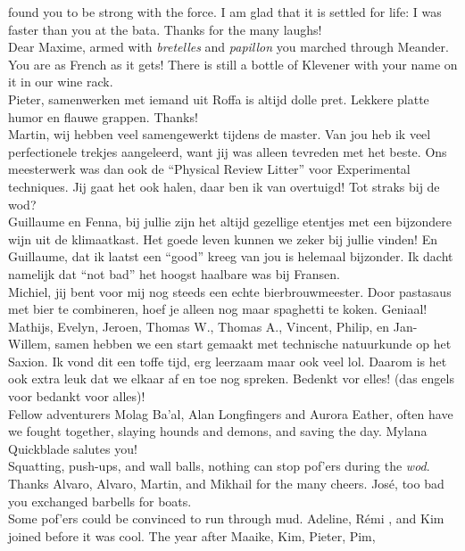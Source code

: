 found you to be strong with the force. I am glad that it is settled for life:
I was faster than you at the bata. Thanks for the many laughs!\\
\indent Dear Maxime, armed with \emph{bretelles} and \emph{papillon} you
marched through Meander. You are as French as it gets! There is still a bottle
of Klevener with your name on it in our wine rack.\\
\mfl{\flagnld}\indent Pieter, samenwerken met iemand uit Roffa is altijd dolle
pret. Lekkere platte humor en flauwe grappen. Thanks!\\
\indent Martin, wij hebben veel samengewerkt tijdens de master. Van jou heb ik
veel perfectionele trekjes aangeleerd, want jij was alleen tevreden met het
beste. Ons meesterwerk was dan ook de ``Physical Review Litter'' voor
Experimental techniques. Jij gaat het ook halen, daar ben ik van overtuigd!
Tot straks bij de wod?\\
\indent Guillaume en Fenna, bij jullie zijn het altijd gezellige etentjes met
een bijzondere wijn uit de klimaatkast. Het goede leven kunnen we zeker bij
jullie vinden! En Guillaume, dat ik laatst een ``good'' kreeg van jou is
helemaal bijzonder. Ik dacht namelijk dat ``not bad'' het hoogst haalbare was
bij Fransen.\\
\indent Michiel, jij bent voor mij nog steeds een echte bierbrouwmeester. Door
pastasaus met bier te combineren, hoef je alleen nog maar spaghetti te koken.
Geniaal!\\
\indent Mathijs, Evelyn, Jeroen, Thomas W., Thomas A., Vincent, Philip, en
Jan-Willem, samen hebben we een start gemaakt met technische natuurkunde op
het Saxion. Ik vond dit een toffe tijd, erg leerzaam maar ook veel lol. Daarom
is het ook extra leuk dat we elkaar af en toe nog spreken. Bedenkt vor elles!
(das engels voor bedankt voor alles)!\\
\mf{\flagus}\indent Fellow adventurers Molag Ba'al, Alan Longfingers and
Aurora Eather, often have we fought together, slaying hounds and demons, and
saving the day. Mylana Quickblade salutes you!\\ 
\indent Squatting, push-ups, and wall balls, nothing can stop pof'ers during
the \emph{wod}. Thanks Alvaro, Alvaro, Martin, and Mikhail for the many
cheers. Jos\'e, too bad you exchanged barbells for boats.\\ 
\indent Some pof'ers could be convinced to run through mud. Adeline, R\'emi ,
and Kim joined before it was cool. The year after Maaike, Kim, Pieter, Pim,
